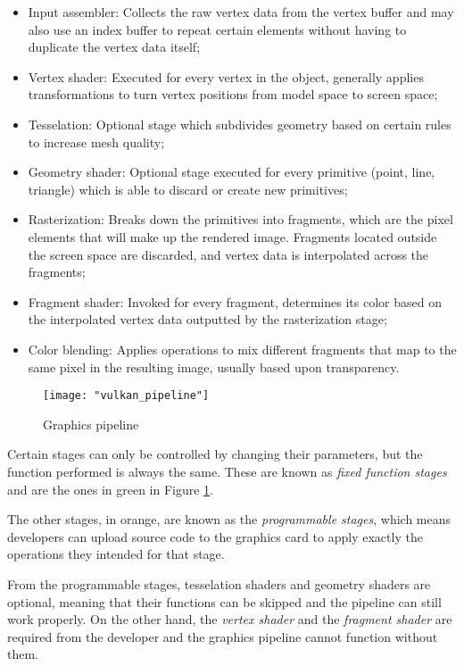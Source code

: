 \begin{itemize}
    \item Input assembler: Collects the raw vertex data from the vertex buffer and may also use an index buffer to repeat certain elements without having to duplicate the vertex data itself;
    \item Vertex shader: Executed for every vertex in the object, generally applies transformations to turn vertex positions from model space to screen space;
    \item Tesselation: Optional stage which subdivides geometry based on certain rules to increase mesh quality;
    \item Geometry shader: Optional stage executed for every primitive (point, line, triangle) which is able to discard or create new primitives;
    \item Rasterization: Breaks down the primitives into fragments, which are the pixel elements that will make up the rendered image. Fragments located outside the screen space are discarded, and vertex data is interpolated across the fragments;
    \item Fragment shader: Invoked for every fragment, determines its color based on the interpolated vertex data outputted by the rasterization stage;
    \item Color blending: Applies operations to mix different fragments that map to the same pixel in the resulting image, usually based upon transparency.
\end{itemize}

\begin{figure}[h]
    \caption{Graphics pipeline}
    \begin{center}
        \texttt{[image: "vulkan\_pipeline"]}
    \end{center}
    \label{fig:graphics_pipeline}
\end{figure}

Certain stages can only be controlled by changing their parameters, but the function performed is always the same. These are known as \textit{fixed function stages} and are the ones in green in Figure \ref{fig:graphics_pipeline}.

The other stages, in orange, are known as the \textit{programmable stages}, which means developers can upload source code to the graphics card to apply exactly the operations they intended for that stage.

From the programmable stages, tesselation shaders and geometry shaders are optional, meaning that their functions can be skipped and the pipeline can still work properly. On the other hand, the \textit{vertex shader} and the \textit{fragment shader} are required from the developer and the graphics pipeline cannot function without them.

